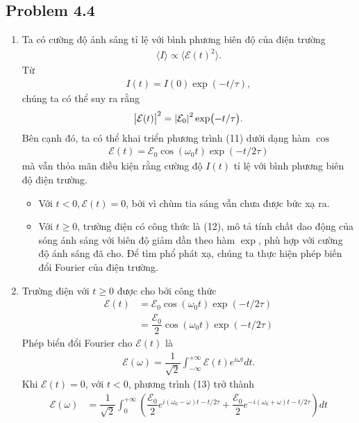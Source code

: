 \documentclass{article}
\newcommand{\f}[2]{\dfrac{#1}{#2}}
\begin{document}
\subsection*{Problem 4.4}
\begin{enumerate}[label=(\alph*)]
	\item Ta có cường độ ánh sáng tỉ lệ với bình phương biên độ của điện trường
	\begin{align}
		\langle I \rangle \propto  \langle \mathcal{E}(t)^2 \rangle.
	\end{align}
	Từ 
	\begin{align}
		I(t) = I(0) \exp(-t/\tau),
	\end{align}
	chúng ta có thể suy ra rằng
	\begin{align}
		\abs{\mathcal{E}(t)}^2 = \abs{\mathcal{E}_0}^2 \exp(-t/\tau).
	\end{align}
	Bên cạnh đó, ta có thể khai triển phương trình (11) dưới dạng hàm $\cos$
	\begin{align}
		\mathcal{E}(t) = \mathcal{E}_0 \cos(\omega_0 t) \exp(-t/2\tau)
	\end{align}
	mà vẫn thỏa mãn điều kiện rằng cường độ $I(t)$ tỉ lệ với bình phương biên độ điện trường.
	\begin{itemize}
		\item Với $t<0, \mathcal{E}(t) = 0$, bởi vì chùm tia sáng vẫn chưa được bức xạ ra.
		\item Với $t \geq 0$, trường điện có công thức là (12), mô tả tính chất dao động của sóng ánh sáng với biên độ giảm dần theo hàm $\exp$, phù hợp với cường độ ánh sáng đã cho. Để tìm phổ phát xạ, chúng ta thực hiện phép biến đổi Fourier của điện trường.
	\end{itemize}
	\item Trường điện với $t \geq 0$ được cho bởi công thức
	\begin{align*}
		\mathcal{E}(t) 
		& = \mathcal{E}_0 \cos(\omega_0 t) \exp(-t/2\tau) \\
		& = \f{\mathcal{E}_0}{2} \cos(\omega_0 t) \exp(-t/2\tau)
	\end{align*}
	Phép biển đổi Fourier cho $\mathcal{E}(t)$ là
	\begin{align}
		\mathcal{E}(\omega) = \f{1}{\sqrt{2}} \int_{-\infty}^{+\infty} \mathcal{E}(t) e^{i\omega t} dt.
	\end{align} 
	Khi $\mathcal{E}(t) = 0$, với $t < 0$, phương trình (13) trở thành
	\begin{align}
		\mathcal{E}(\omega)
		&= \f{1}{\sqrt{2}} \int_{0}^{+\infty} \left( \f{\mathcal{E}_0}{2} e^{i(\omega_0 - \omega)t - t/2\tau} + \f{\mathcal{E}_0}{2} e^{-i(\omega_0 + \omega)t - t/2\tau} \right) dt \nonumber \\

\end{align}
\end{enumerate}
\end{document}
